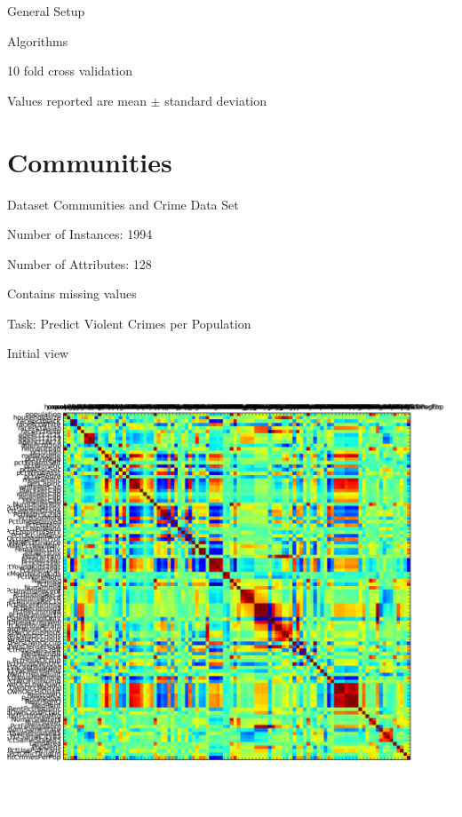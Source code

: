 \documentclass[12pt]{beamer}
\author{Martin Dobiasch \& Eugen Havasi \& Peter Rjabcsenko}
\begin{document}
\begin{frame}
\titlepage
\end{frame}


\begin{frame}{General Setup}
\begin{block}{Algorithms}

\end{block}

10 fold cross validation

Values reported are mean $\pm$ standard deviation

\end{frame}

\section{Communities}
\begin{frame}{Dataset}
Communities and Crime Data Set

Number of Instances: 1994

Number of Attributes: 128

Contains missing values

Task: Predict Violent Crimes per Population
\end{frame}

\begin{frame}{Initial view}
\includegraphics[height=\textheight,width=\textwidth,keepaspectratio]{plots/communities_orig.png}
\end{frame}
\end{document}
